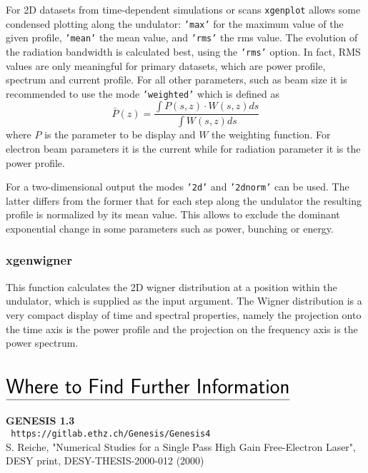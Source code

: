 \documentclass[12pt]{book}
\begin{document}
For 2D datasets from time-dependent simulations or scans {\tt xgenplot} allows some condensed plotting along the undulator: {\tt 'max'} for the maximum value of the given profile, {\tt 'mean'} the mean value, and {\tt 'rms'} the rms value. The evolution of the radiation bandwidth is calculated best, using the {\tt 'rms'} option. In fact, RMS values are only meaningful for primary datasets, which are power profile, spectrum and current profile. For all other parameters, such as beam size it is recommended to use the mode {\tt 'weighted'} which is defined as
\begin{displaymath}
\bar{P}(z)=\frac{\int P(s,z)\cdot W(s,z) ds}{\int W(s,z)ds}
\end{displaymath}
where $P$ is the parameter to be display and $W$ the weighting function. For electron beam parameters it is the current while for radiation parameter it is the power profile.

For a two-dimensional output the modes {\tt '2d'} and {\tt '2dnorm'} can be used. The latter differs from the former that for each step along the undulator the resulting profile is normalized by its mean value. This allows to exclude the dominant exponential change in some parameters such as power, bunching or energy.

\subsection{\sf xgenwigner}
This function calculates the 2D wigner distribution at a position within the undulator, which is supplied as the input argument.  The Wigner distribution is a very compact display of time and spectral properties, namely the projection onto the time axis is the power profile and the projection on the frequency axis is the power spectrum.




\chapter*{\vspace{-3cm}$\underline{\mbox{\rule[-0.5em]{0cm}{1em}\huge\sf Where to Find Further Information}}$}
  
{\bf GENESIS 1.3}\\
{\tt 
https://gitlab.ethz.ch/Genesis/Genesis4
}
\\
S. Reiche, "Numerical Studies for a Single Pass High Gain Free-Electron Laser", 
DESY print, DESY-THESIS-2000-012 (2000)
\end{document}
